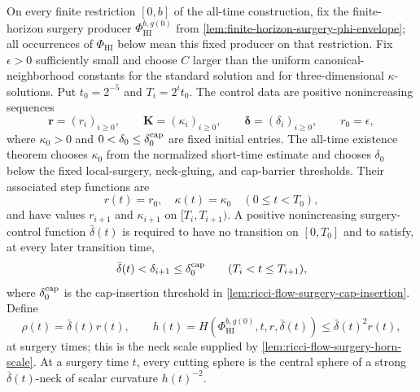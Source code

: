 \begin{definition}
\label{def:controlled-surgery-parameters}
\notready
On every finite restriction $[0,b]$ of the all-time construction, fix the
finite-horizon surgery producer $\Phi_{\mathrm{HI}}^{b,g(0)}$ from
\ref{lem:finite-horizon-surgery-phi-envelope}; all occurrences of
$\Phi_{\mathrm{HI}}$ below mean this fixed producer on that restriction.
Fix $\epsilon>0$ sufficiently small and choose $C$ larger than the uniform
canonical-neighborhood constants for the standard solution and for
three-dimensional $\kappa$-solutions.  Put $t_0=2^{-5}$ and
$T_i=2^it_0$.  The control data are positive nonincreasing sequences
\[
 \mathbf r=(r_i)_{i\ge0},\qquad
 \mathbf K=(\kappa_i)_{i\ge0},\qquad
 \boldsymbol\delta=(\delta_i)_{i\ge0},
\qquad r_0=\epsilon,
\]
where $\kappa_0>0$ and $0<\delta_0\le\delta_0^{\rm cap}$ are fixed initial
entries.  The all-time
existence theorem chooses $\kappa_0$ from the normalized short-time estimate
and chooses $\delta_0$ below the fixed local-surgery, neck-gluing, and
cap-barrier thresholds.  Their associated step functions are
\[
 r(t)=r_0,\quad\kappa(t)=\kappa_0
 \quad(0\le t<T_0),
\]
and have values $r_{i+1}$ and $\kappa_{i+1}$ on
$[T_i,T_{i+1})$.  A positive nonincreasing surgery-control function
$\bar\delta(t)$ is required to have no transition on $[0,T_0]$ and to
satisfy, at every later transition time,
\[
 \bar\delta(t)<\delta_{i+1}\le\delta_0^{\rm cap}
 \qquad(T_i<t\le T_{i+1}),
\]
where $\delta_0^{\rm cap}$ is the cap-insertion threshold in
\ref{lem:ricci-flow-surgery-cap-insertion}.
Define
\[
 \rho(t)=\bar\delta(t)r(t),
 \qquad
 h(t)=H(\Phi_{\mathrm{HI}}^{b,g(0)},t,r,\bar\delta(t))
 \le \bar\delta(t)^2r(t),
\]
at surgery times; this is the neck scale supplied by
\ref{lem:ricci-flow-surgery-horn-scale}.
At a surgery time $t$, every cutting sphere is the central sphere of a strong
$\bar\delta(t)$-neck of scalar curvature $h(t)^{-2}$.
\end{definition}

